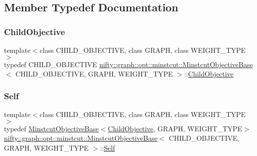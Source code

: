 \subsection{Member Typedef Documentation}
\mbox{\label{classnifty_1_1graph_1_1opt_1_1minstcut_1_1MinstcutObjectiveBase_a76bb16eab8d99a40abe6326d17bd0769}} 
\subsubsection{\texorpdfstring{Child\+Objective}{ChildObjective}}
{\footnotesize\ttfamily template$<$class C\+H\+I\+L\+D\+\_\+\+O\+B\+J\+E\+C\+T\+I\+VE, class G\+R\+A\+PH, class W\+E\+I\+G\+H\+T\+\_\+\+T\+Y\+PE$>$ \\
typedef C\+H\+I\+L\+D\+\_\+\+O\+B\+J\+E\+C\+T\+I\+VE \hyperlink{classnifty_1_1graph_1_1opt_1_1minstcut_1_1MinstcutObjectiveBase}{nifty\+::graph\+::opt\+::minstcut\+::\+Minstcut\+Objective\+Base}$<$ C\+H\+I\+L\+D\+\_\+\+O\+B\+J\+E\+C\+T\+I\+VE, G\+R\+A\+PH, W\+E\+I\+G\+H\+T\+\_\+\+T\+Y\+PE $>$\+::\hyperlink{classnifty_1_1graph_1_1opt_1_1minstcut_1_1MinstcutObjectiveBase_a76bb16eab8d99a40abe6326d17bd0769}{Child\+Objective}}

\mbox{\label{classnifty_1_1graph_1_1opt_1_1minstcut_1_1MinstcutObjectiveBase_a6ed9ee2c13bc67e3c6993837a30c24b9}} 
\subsubsection{\texorpdfstring{Self}{Self}}
{\footnotesize\ttfamily template$<$class C\+H\+I\+L\+D\+\_\+\+O\+B\+J\+E\+C\+T\+I\+VE, class G\+R\+A\+PH, class W\+E\+I\+G\+H\+T\+\_\+\+T\+Y\+PE$>$ \\
typedef \hyperlink{classnifty_1_1graph_1_1opt_1_1minstcut_1_1MinstcutObjectiveBase}{Minstcut\+Objective\+Base}$<$\hyperlink{classnifty_1_1graph_1_1opt_1_1minstcut_1_1MinstcutObjectiveBase_a76bb16eab8d99a40abe6326d17bd0769}{Child\+Objective}, G\+R\+A\+PH, W\+E\+I\+G\+H\+T\+\_\+\+T\+Y\+PE$>$ \hyperlink{classnifty_1_1graph_1_1opt_1_1minstcut_1_1MinstcutObjectiveBase}{nifty\+::graph\+::opt\+::minstcut\+::\+Minstcut\+Objective\+Base}$<$ C\+H\+I\+L\+D\+\_\+\+O\+B\+J\+E\+C\+T\+I\+VE, G\+R\+A\+PH, W\+E\+I\+G\+H\+T\+\_\+\+T\+Y\+PE $>$\+::\hyperlink{classnifty_1_1graph_1_1opt_1_1minstcut_1_1MinstcutObjectiveBase_a6ed9ee2c13bc67e3c6993837a30c24b9}{Self}}



